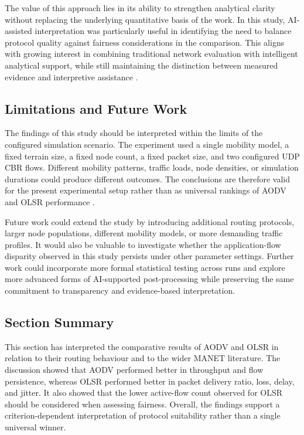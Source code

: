\documentclass{Academic}
\begin{document}
The value of this approach lies in its ability to strengthen analytical clarity without replacing the underlying quantitative basis of the work. In this study, AI-assisted interpretation was particularly useful in identifying the need to balance protocol quality against fairness considerations in the comparison. This aligns with growing interest in combining traditional network evaluation with intelligent analytical support, while still maintaining the distinction between measured evidence and interpretive assistance \parencite{bhatia2022,duong2024,schuler2021}.

\subsection{Limitations and Future Work}

The findings of this study should be interpreted within the limits of the configured simulation scenario. The experiment used a single mobility model, a fixed terrain size, a fixed node count, a fixed packet size, and two configured UDP CBR flows. Different mobility patterns, traffic loads, node densities, or simulation durations could produce different outcomes. The conclusions are therefore valid for the present experimental setup rather than as universal rankings of AODV and OLSR performance \parencite{kour2025,sarkar2025,selim2025}.

Future work could extend the study by introducing additional routing protocols, larger node populations, different mobility models, or more demanding traffic profiles. It would also be valuable to investigate whether the application-flow disparity observed in this study persists under other parameter settings. Further work could incorporate more formal statistical testing across runs and explore more advanced forms of AI-supported post-processing while preserving the same commitment to transparency and evidence-based interpretation.

\subsection{Section Summary}

This section has interpreted the comparative results of AODV and OLSR in relation to their routing behaviour and to the wider MANET literature. The discussion showed that AODV performed better in throughput and flow persistence, whereas OLSR performed better in packet delivery ratio, loss, delay, and jitter. It also showed that the lower active-flow count observed for OLSR should be considered when assessing fairness. Overall, the findings support a criterion-dependent interpretation of protocol suitability rather than a single universal winner.
\newpage
\end{document}
